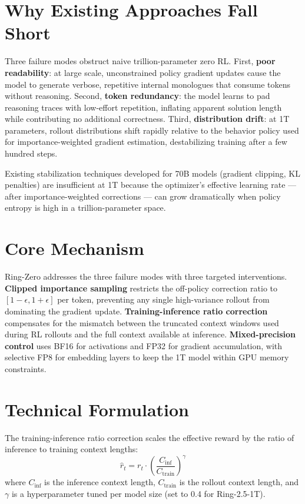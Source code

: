 \documentclass[10pt,twocolumn]{article}
\begin{document}
\section{Why Existing Approaches Fall Short}

Three failure modes obstruct naive trillion-parameter zero RL.
First, \textbf{poor readability}: at large scale, unconstrained
policy gradient updates cause the model to generate verbose,
repetitive internal monologues that consume tokens without reasoning.
Second, \textbf{token redundancy}: the model learns to pad reasoning
traces with low-effort repetition, inflating apparent solution length
while contributing no additional correctness.
Third, \textbf{distribution drift}: at 1T parameters, rollout
distributions shift rapidly relative to the behavior policy used for
importance-weighted gradient estimation, destabilizing training after
a few hundred steps.

Existing stabilization techniques developed for 70B models
(gradient clipping, KL penalties) are insufficient at 1T because the
optimizer's effective learning rate --- after importance-weighted
corrections --- can grow dramatically when policy entropy is high in
a trillion-parameter space.

\section{Core Mechanism}

Ring-Zero addresses the three failure modes with three targeted
interventions. \textbf{Clipped importance sampling} restricts the
off-policy correction ratio to $[1-\epsilon, 1+\epsilon]$ per token,
preventing any single high-variance rollout from dominating the
gradient update. \textbf{Training-inference ratio correction}
compensates for the mismatch between the truncated context windows
used during RL rollouts and the full context available at inference.
\textbf{Mixed-precision control} uses BF16 for activations and FP32
for gradient accumulation, with selective FP8 for embedding layers
to keep the 1T model within GPU memory constraints.

\section{Technical Formulation}

The training-inference ratio correction scales the effective reward
by the ratio of inference to training context lengths:
\[
\hat{r}_t = r_t \cdot \left(\frac{C_{\text{inf}}}{C_{\text{train}}}\right)^\gamma
\]
where $C_{\text{inf}}$ is the inference context length, $C_{\text{train}}$
is the rollout context length, and $\gamma$ is a hyperparameter tuned
per model size (set to 0.4 for Ring-2.5-1T).
\end{document}
